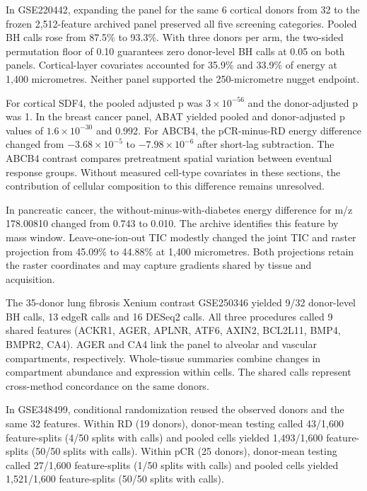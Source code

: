 In GSE220442, expanding the panel for the same 6 cortical donors from 32 to the frozen 2,512-feature archived panel preserved all five screening categories. Pooled BH calls rose from 87.5\% to 93.3\%. With three donors per arm, the two-sided permutation floor of 0.10 guarantees zero donor-level BH calls at 0.05 on both panels. Cortical-layer covariates accounted for 35.9\% and 33.9\% of energy at 1,400 micrometres. Neither panel supported the 250-micrometre nugget endpoint.

For cortical SDF4, the pooled adjusted p was $3\times 10^{-56}$ and the donor-adjusted p was 1. In the breast cancer panel, ABAT yielded pooled and donor-adjusted p values of $1.6\times 10^{-30}$ and 0.992. For ABCB4, the pCR-minus-RD energy difference changed from $-3.68\times 10^{-5}$ to $-7.98\times 10^{-6}$ after short-lag subtraction. The ABCB4 contrast compares pretreatment spatial variation between eventual response groups. Without measured cell-type covariates in these sections, the contribution of cellular composition to this difference remains unresolved.

In pancreatic cancer, the without-minus-with-diabetes energy difference for m/z 178.00810 changed from 0.743 to 0.010. The archive identifies this feature by mass window. Leave-one-ion-out TIC modestly changed the joint TIC and raster projection from 45.09\% to 44.88\% at 1,400 micrometres. Both projections retain the raster coordinates and may capture gradients shared by tissue and acquisition.

The 35-donor lung fibrosis Xenium contrast GSE250346 \cite{geo250346} yielded 9/32 donor-level BH calls, 13 edgeR calls and 16 DESeq2 calls. All three procedures called 9 shared features (ACKR1, AGER, APLNR, ATF6, AXIN2, BCL2L11, BMP4, BMPR2, CA4). AGER and CA4 link the panel to alveolar and vascular compartments, respectively. Whole-tissue summaries combine changes in compartment abundance and expression within cells. The shared calls represent cross-method concordance on the same donors.

In GSE348499, conditional randomization reused the observed donors and the same 32 features. Within RD (19 donors), donor-mean testing called 43/1,600 feature-splits (4/50 splits with calls) and pooled cells yielded 1,493/1,600 feature-splits (50/50 splits with calls). Within pCR (25 donors), donor-mean testing called 27/1,600 feature-splits (1/50 splits with calls) and pooled cells yielded 1,521/1,600 feature-splits (50/50 splits with calls).


